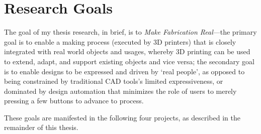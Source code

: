 \section{Research Goals}
The goal of my thesis research, in brief, is to \textit{Make Fabrication Real}---the primary goal is to enable a making process (executed by 3D printers) that is closely integrated with real world objects and usages, whereby 3D printing can be used to extend, adapt, and support existing objects and vice versa; the secondary goal is to enable designs to be expressed and driven by `real people', as opposed to being constrained by traditional CAD tools's limited expressiveness, or dominated by design automation that minimizes the role of users to merely pressing a few buttons to advance to process.

These goals are manifested in the following four projects, as described in the remainder of this thesis.

